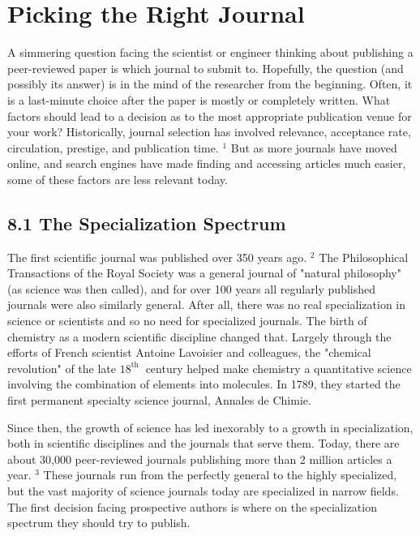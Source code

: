 \section*{Picking the Right Journal}
A simmering question facing the scientist or engineer thinking about publishing a peer-reviewed paper is which journal to submit to. Hopefully, the question (and possibly its answer) is in the mind of the researcher from the beginning. Often, it is a last-minute choice after the paper is mostly or completely written. What factors should lead to a decision as to the most appropriate publication venue for your work? Historically, journal selection has involved relevance, acceptance rate, circulation, prestige, and publication time. ${ }^{1}$ But as more journals have moved online, and search engines have made finding and accessing articles much easier, some of these factors are less relevant today.

\subsection*{8.1 The Specialization Spectrum}
The first scientific journal was published over 350 years ago. ${ }^{2}$ The Philosophical Transactions of the Royal Society was a general journal of "natural philosophy" (as science was then called), and for over 100 years all regularly published journals were also similarly general. After all, there was no real specialization in science or scientists and so no need for specialized journals. The birth of chemistry as a modern scientific discipline changed that. Largely through the efforts of French scientist Antoine Lavoisier and colleagues, the "chemical revolution" of the late $18^{\text{th }}$ century helped make chemistry a quantitative science involving the combination of elements into molecules. In 1789, they started the first permanent specialty science journal, Annales de Chimie.

Since then, the growth of science has led inexorably to a growth in specialization, both in scientific disciplines and the journals that serve them. Today, there are about 30,000 peer-reviewed journals publishing more than 2 million articles a year. ${ }^{3}$ These journals run from the perfectly general to the highly specialized, but the vast majority of science journals today are specialized in narrow fields. The first decision facing prospective authors is where on the specialization spectrum they should try to publish.


